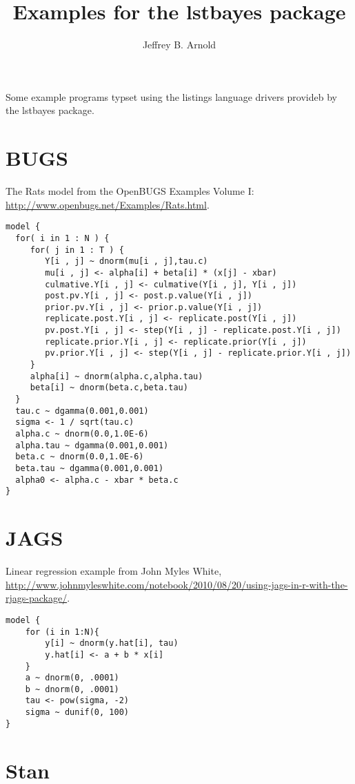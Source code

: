 \documentclass{article}
\title{Examples for the \textsf{lstbayes} package}
\author{Jeffrey B. Arnold}
\begin{document}
\maketitle{}

Some example programs typset using the \textsf{listings} language drivers provideb by the \textsf{lstbayes} package.

\section{BUGS}

The Rats model from the OpenBUGS Examples Volume I: \url{http://www.openbugs.net/Examples/Rats.html}.
\begin{lstlisting}[language=BUGS]
model {
  for( i in 1 : N ) {
     for( j in 1 : T ) {
        Y[i , j] ~ dnorm(mu[i , j],tau.c)
        mu[i , j] <- alpha[i] + beta[i] * (x[j] - xbar)
        culmative.Y[i , j] <- culmative(Y[i , j], Y[i , j])
        post.pv.Y[i , j] <- post.p.value(Y[i , j])
        prior.pv.Y[i , j] <- prior.p.value(Y[i , j])
        replicate.post.Y[i , j] <- replicate.post(Y[i , j])
        pv.post.Y[i , j] <- step(Y[i , j] - replicate.post.Y[i , j])
        replicate.prior.Y[i , j] <- replicate.prior(Y[i , j])
        pv.prior.Y[i , j] <- step(Y[i , j] - replicate.prior.Y[i , j])
     }
     alpha[i] ~ dnorm(alpha.c,alpha.tau)
     beta[i] ~ dnorm(beta.c,beta.tau)
  }
  tau.c ~ dgamma(0.001,0.001)
  sigma <- 1 / sqrt(tau.c)
  alpha.c ~ dnorm(0.0,1.0E-6)   
  alpha.tau ~ dgamma(0.001,0.001)
  beta.c ~ dnorm(0.0,1.0E-6)
  beta.tau ~ dgamma(0.001,0.001)
  alpha0 <- alpha.c - xbar * beta.c   
} 
\end{lstlisting}


\section{JAGS}

Linear regression example from John Myles White, \url{http://www.johnmyleswhite.com/notebook/2010/08/20/using-jags-in-r-with-the-rjags-package/}.

\begin{lstlisting}[language=JAGS]
model {
	for (i in 1:N){
		y[i] ~ dnorm(y.hat[i], tau)
		y.hat[i] <- a + b * x[i]
	}
	a ~ dnorm(0, .0001)
	b ~ dnorm(0, .0001)
	tau <- pow(sigma, -2)
	sigma ~ dunif(0, 100)
}
\end{lstlisting}


\section{Stan}
\end{document}
